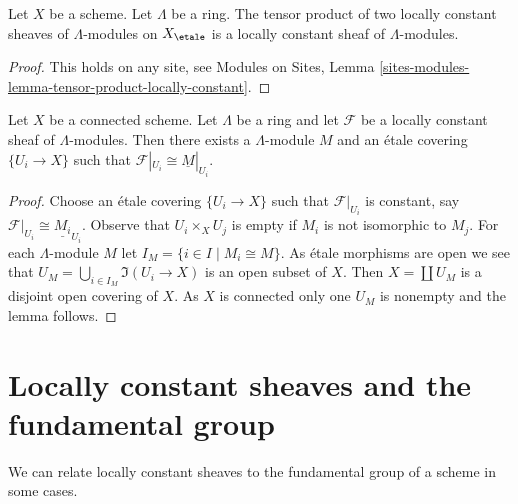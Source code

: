 \begin{lemma}
\label{lemma-tensor-product-locally-constant}
Let $X$ be a scheme. Let $\Lambda$ be a ring.
The tensor product of two locally constant sheaves of $\Lambda$-modules
on $X_\etale$ is a locally constant sheaf of $\Lambda$-modules.
\end{lemma}

\begin{proof}
This holds on any site, see
Modules on Sites, Lemma
\ref{sites-modules-lemma-tensor-product-locally-constant}.
\end{proof}

\begin{lemma}
\label{lemma-connected-locally-constant}
Let $X$ be a connected scheme. Let $\Lambda$ be a ring and let
$\mathcal{F}$ be a locally constant sheaf of $\Lambda$-modules.
Then there exists a $\Lambda$-module $M$ and an \'etale covering
$\{U_i \to X\}$ such that $\mathcal{F}|_{U_i} \cong \underline{M}|_{U_i}$.
\end{lemma}

\begin{proof}
Choose an \'etale covering
$\{U_i \to X\}$ such that $\mathcal{F}|_{U_i}$ is constant, say
$\mathcal{F}|_{U_i} \cong \underline{M_i}_{U_i}$.
Observe that $U_i \times_X U_j$ is empty if $M_i$ is not isomorphic
to $M_j$.
For each $\Lambda$-module $M$ let $I_M = \{i \in I \mid M_i \cong M\}$.
As \'etale morphisms are open we see that
$U_M = \bigcup_{i \in I_M} \Im(U_i \to X)$
is an open subset of $X$. Then $X = \coprod U_M$ is a disjoint
open covering of $X$. As $X$ is connected only one $U_M$ is nonempty
and the lemma follows.
\end{proof}






\section{Locally constant sheaves and the fundamental group}
\label{section-pione}

\noindent
We can relate locally constant sheaves to the fundamental group
of a scheme in some cases.

